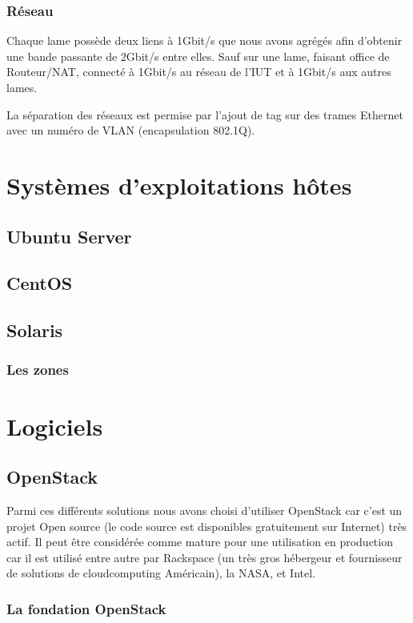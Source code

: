 \documentclass[a4paper,oneside]{report}
\begin{document}
\subsection{Réseau}
Chaque lame possède deux liens à 1Gbit/s que nous avons agrégés afin d'obtenir une bande passante de 2Gbit/s entre elles.
Sauf sur une lame, faisant office de Routeur/NAT, connecté à 1Gbit/s au réseau de l'IUT et à 1Gbit/s aux autres lames.

La séparation des réseaux est permise par l'ajout de tag sur des trames Ethernet avec un numéro de VLAN (encapsulation 802.1Q).


\chapter{Systèmes d'exploitations hôtes}
\section{Ubuntu Server}

\section{CentOS}

\section{Solaris}

\subsection{Les zones}


\chapter{Logiciels}
\section{OpenStack}
Parmi ces différents solutions nous avons choisi d'utiliser OpenStack car c’est un projet Open source (le code source est disponibles gratuitement sur Internet) très actif.
Il peut être considérée comme mature pour une utilisation en production car il est utilisé entre autre par Rackspace (un très gros hébergeur et fournisseur de solutions de \gls{cloudcomputing} Américain), la NASA, et Intel.

\subsection{La fondation OpenStack}
\end{document}
